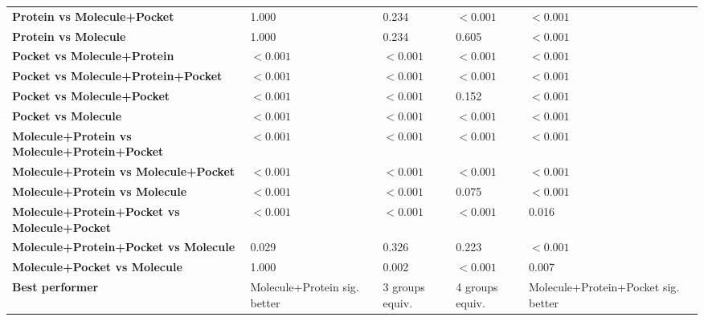 \begin{table}[H]
{\begin{tabular}{lllll}
        \textbf{Protein vs Molecule+Pocket} & 1.000 & 0.234 & $< 0.001$ & $< 0.001$ \\
        \textbf{Protein vs Molecule} & 1.000 & 0.234 & 0.605 & $< 0.001$ \\
        \textbf{Pocket vs Molecule+Protein} & $< 0.001$ & $< 0.001$ & $< 0.001$ & $< 0.001$ \\
        \textbf{Pocket vs Molecule+Protein+Pocket} & $< 0.001$ & $< 0.001$ & $< 0.001$ & $< 0.001$ \\
        \textbf{Pocket vs Molecule+Pocket} & $< 0.001$ & $< 0.001$ & 0.152 & $< 0.001$ \\
        \textbf{Pocket vs Molecule} & $< 0.001$ & $< 0.001$ & $< 0.001$ & $< 0.001$ \\
        \textbf{Molecule+Protein vs Molecule+Protein+Pocket} & $< 0.001$ & $< 0.001$ & $< 0.001$ & $< 0.001$ \\
        \textbf{Molecule+Protein vs Molecule+Pocket} & $< 0.001$ & $< 0.001$ & $< 0.001$ & $< 0.001$ \\
        \textbf{Molecule+Protein vs Molecule} & $< 0.001$ & $< 0.001$ & 0.075 & $< 0.001$ \\
        \textbf{Molecule+Protein+Pocket vs Molecule+Pocket} & $< 0.001$ & $< 0.001$ & $< 0.001$ & 0.016 \\
        \textbf{Molecule+Protein+Pocket vs Molecule} & 0.029 & 0.326 & 0.223 & $< 0.001$ \\
        \textbf{Molecule+Pocket vs Molecule} & 1.000 & 0.002 & $< 0.001$ & 0.007 \\
        \textbf{Best performer} & Molecule+Protein sig. better & 3 groups equiv. & 4 groups equiv. & Molecule+Protein+Pocket sig. better \\
        \bottomrule
    \end{tabular}}
\end{table}